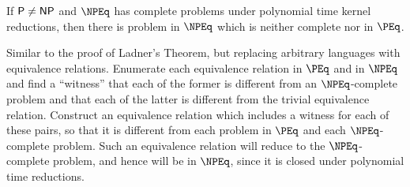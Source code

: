 \begin{theorem}
  If ${\mathsf{P}}\neq{\ensuremath{\mathsf{NP}}}$ and $\NPEq$ has complete problems under polynomial time kernel reductions, then there is problem in $\NPEq$ which is neither complete nor in $\PEq$.
\end{theorem}
\begin{proofidea}
  Similar to the proof of Ladner's Theorem, but replacing arbitrary languages with equivalence relations.
  Enumerate each equivalence relation in $\PEq$ and in $\NPEq$ and find a ``witness'' that each of the former is different from an $\NPEq$-complete problem and that each of the latter is different from the trivial equivalence relation.
  Construct an equivalence relation which includes a witness for each of these pairs, so that it is different from each problem in $\PEq$ and each $\NPEq$-complete problem.
  Such an equivalence relation will reduce to the $\NPEq$-complete problem, and hence will be in $\NPEq$, since it is closed under polynomial time reductions.
\end{proofidea}
